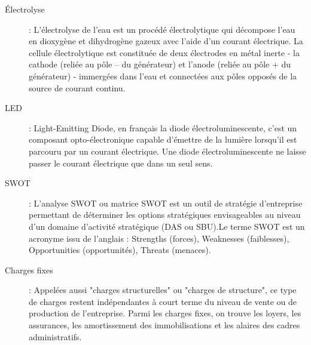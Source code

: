 \begin{description}
\item[Électrolyse] : L’électrolyse de l'eau est un procédé électrolytique qui décompose l'eau en dioxygène et dihydrogène gazeux avec l'aide d'un courant électrique. La cellule électrolytique est constituée de deux électrodes en métal inerte - la cathode (reliée au pôle – du générateur) et l'anode (reliée au pôle + du générateur) - immergées dans l'eau et connectées aux pôles opposés de la source de courant continu.

\item[LED] : Light-Emitting Diode, en français la diode électroluminescente, c'est un composant opto-électronique capable d’émettre de la lumière lorsqu’il est parcouru par un courant électrique. Une diode électroluminescente ne laisse passer le courant électrique que dans un seul sens.

\item[SWOT] : L’analyse SWOT ou matrice SWOT est un outil de stratégie d'entreprise permettant de déterminer les options stratégiques envisageables au niveau d'un domaine d'activité stratégique (DAS ou SBU).Le terme SWOT est un acronyme issu de l'anglais : Strengths (forces), Weaknesses (faiblesses), Opportunities (opportunités), Threats (menaces).

\item[Charges fixes] : Appelées aussi "charges structurelles" ou "charges de structure", ce type de charges restent indépendantes à court terme du niveau de vente ou de production de l’entreprise. Parmi les charges fixes, on trouve les loyers, les assurances, les amortissement des immobilisations et les alaires des cadres administratifs.

\end{description}